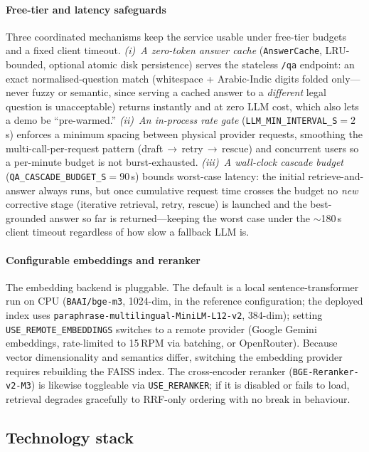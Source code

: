 \documentclass[final,1p,times]{elsarticle}
\begin{document}
\paragraph{Free-tier and latency safeguards} Three coordinated mechanisms keep
the service usable under free-tier budgets and a fixed client timeout.
\emph{(i)~A zero-token answer cache} (\texttt{AnswerCache}, LRU-bounded, optional
atomic disk persistence) serves the stateless \texttt{/qa} endpoint: an exact
normalised-question match (whitespace + Arabic-Indic digits folded only---never
fuzzy or semantic, since serving a cached answer to a \emph{different} legal
question is unacceptable) returns instantly and at zero LLM cost, which also lets
a demo be ``pre-warmed.'' \emph{(ii)~An in-process rate gate}
(\texttt{LLM\_MIN\_INTERVAL\_S}$=2$\,s) enforces a minimum spacing between
physical provider requests, smoothing the multi-call-per-request pattern
(draft\,$\rightarrow$\,retry\,$\rightarrow$\,rescue) and concurrent users so a
per-minute budget is not burst-exhausted. \emph{(iii)~A wall-clock cascade budget}
(\texttt{QA\_CASCADE\_BUDGET\_S}$=90$\,s) bounds worst-case latency: the initial
retrieve-and-answer always runs, but once cumulative request time crosses the
budget no \emph{new} corrective stage (iterative retrieval, retry, rescue) is
launched and the best-grounded answer so far is returned---keeping the worst case
under the $\sim$180\,s client timeout regardless of how slow a fallback LLM is.

\paragraph{Configurable embeddings and reranker} The embedding backend is
pluggable. The default is a local sentence-transformer run on CPU
(\texttt{BAAI/bge-m3}, 1024-dim, in the reference configuration; the deployed
index uses \texttt{paraphrase-multilingual-MiniLM-L12-v2}, 384-dim); setting
\texttt{USE\_REMOTE\_EMBEDDINGS} switches to a remote provider (Google Gemini
embeddings, rate-limited to 15\,RPM via batching, or OpenRouter). Because
vector dimensionality and semantics differ, switching the embedding provider
requires rebuilding the FAISS index. The cross-encoder reranker
(\texttt{BGE-Reranker-v2-M3}) is likewise toggleable via \texttt{USE\_RERANKER};
if it is disabled or fails to load, retrieval degrades gracefully to
RRF-only ordering with no break in behaviour.

\subsection{Technology stack}\label{sec:stack}
\end{document}
